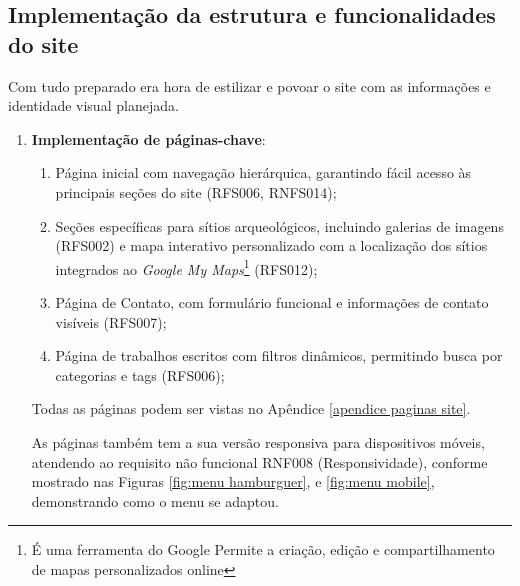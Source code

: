     \subsection{Implementação da estrutura e funcionalidades do site}
    Com tudo preparado era hora de estilizar e povoar o site com as informações e identidade visual planejada.
    \begin{enumerate}
        \item \textbf{Implementação de páginas-chave}:
        \begin{enumerate}
            \item Página inicial com navegação hierárquica, garantindo fácil acesso às principais seções do site (RFS006, RNFS014);
            \item Seções específicas para sítios arqueológicos, incluindo galerias de imagens (RFS002) e mapa interativo personalizado com a localização dos sítios integrados ao \textit{Google My Maps}\footnote{É uma ferramenta do Google Permite a criação, edição e compartilhamento de mapas personalizados online} (RFS012);
            \item Página de Contato, com formulário funcional e informações de contato visíveis (RFS007);
            \item Página de trabalhos escritos com filtros dinâmicos, permitindo busca por categorias e tags (RFS006);
            \end{enumerate}
            Todas as páginas podem ser vistas no Apêndice \ref{apendice paginas site}.

            As páginas também tem a sua versão responsiva para dispositivos móveis, atendendo ao requisito não funcional RNF008 (Responsividade), conforme mostrado nas Figuras \ref{fig:menu hamburguer}, e \ref{fig:menu mobile}, demonstrando como o menu se adaptou. 


\end{enumerate}

